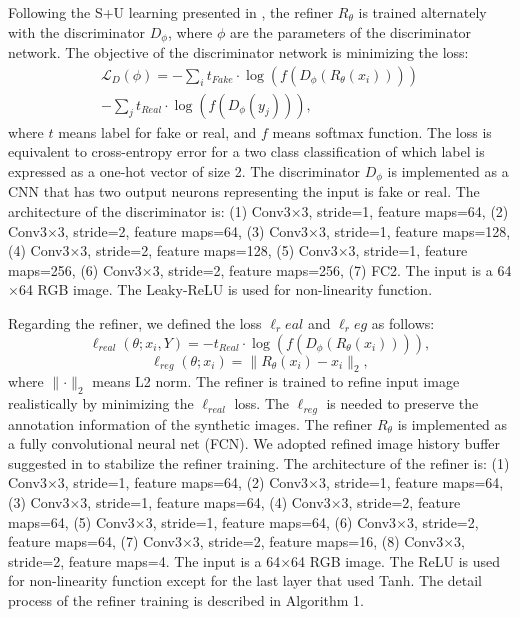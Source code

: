 \documentclass[5p, times]{elsarticle}
\begin{document}
Following the S+U learning presented in \cite{SimGan}, the refiner $R_\theta$ is trained alternately with the discriminator $D_\phi$, where $\phi$ are the parameters of the discriminator network. The objective of the discriminator network is minimizing the loss:
\begin{equation}
\begin{split}
\mathcal{L}_D(\phi)=-\sum_it_{Fake}\cdot\log(f(D_{\phi}(R_\theta(x_i))))\\-\sum_jt_{Real}\cdot\log(f(D_{\phi}(y_j))),
\end{split}
\end{equation}
where $t$ means label for fake or real, and $f$ means softmax function. The loss is equivalent to cross-entropy error for a two class classification of which label is expressed as a one-hot vector of size 2. The discriminator $D_\phi$ is implemented as a CNN that has two output neurons representing the input is fake or real. The architecture of the discriminator is: (1) Conv3$\times$3, stride=1, feature maps=64, (2) Conv3$\times$3, stride=2, feature maps=64, (3) Conv3$\times$3, stride=1, feature maps=128, (4) Conv3$\times$3, stride=2, feature maps=128, (5) Conv3$\times$3, stride=1, feature maps=256, (6) Conv3$\times$3, stride=2, feature maps=256, (7) FC2. The input is a 64$\times$64 RGB image. The Leaky-ReLU is used for non-linearity function.

Regarding the refiner, we defined the loss $\ell_real$ and $\ell_reg$ as follows:
\begin{equation}
\ell_{real}(\theta;x_i,Y)=-t_{Real}\cdot\log(f(D_{\phi}(R_\theta(x_i)))),
\end{equation}
\begin{equation}
\ell_{reg}(\theta;x_i)=\parallel R_\theta(x_i)-x_i\parallel_2,
\end{equation}
where $\parallel\cdot\parallel_2$ means L2 norm. The refiner is trained to refine input image realistically by minimizing the $\ell_{real}$ loss. The $\ell_{reg}$ is needed to preserve the annotation information of the synthetic images. The refiner $R_\theta$ is implemented as a fully convolutional neural net (FCN). We adopted refined image history buffer suggested in \cite{SimGan} to stabilize the refiner training. The architecture of the refiner is: (1) Conv3$\times$3, stride=1, feature maps=64, (2) Conv3$\times$3, stride=1, feature maps=64, (3) Conv3$\times$3, stride=1, feature maps=64, (4) Conv3$\times$3, stride=2, feature maps=64, (5) Conv3$\times$3, stride=1, feature maps=64, (6) Conv3$\times$3, stride=2, feature maps=64, (7) Conv3$\times$3, stride=2, feature maps=16, (8) Conv3$\times$3, stride=2, feature maps=4. The input is a 64$\times$64 RGB image. The ReLU is used for non-linearity function except for the last layer that used Tanh. The detail process of the refiner training is described in Algorithm 1.
\end{document}

